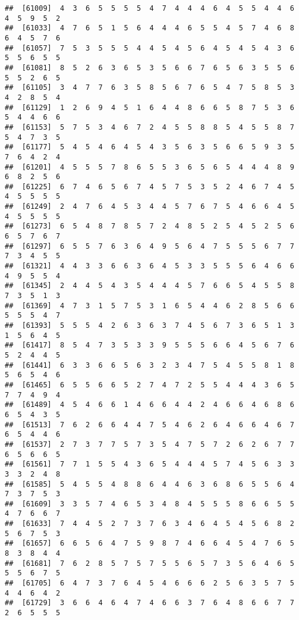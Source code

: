 \documentclass[
]{book}
\begin{document}
\begin{verbatim}
##  [61009]  4  3  6  5  5  5  5  4  7  4  4  4  6  4  5  5  4  4  6  4  5  9  5  2
##  [61033]  4  7  6  5  1  5  6  4  4  4  6  5  5  4  5  7  4  6  8  6  4  5  7  6
##  [61057]  7  5  3  5  5  5  4  4  5  4  5  6  4  5  4  5  4  3  6  5  5  6  5  5
##  [61081]  8  5  2  6  3  6  5  3  5  6  6  7  6  5  6  3  5  5  6  5  5  2  6  5
##  [61105]  3  4  7  7  6  3  5  8  5  6  7  6  5  4  7  5  8  5  3  4  2  8  5  4
##  [61129]  1  2  6  9  4  5  1  6  4  4  8  6  6  5  8  7  5  3  6  5  4  4  6  6
##  [61153]  5  7  5  3  4  6  7  2  4  5  5  8  8  5  4  5  5  8  7  5  4  7  3  5
##  [61177]  5  4  5  4  6  4  5  4  3  5  6  3  5  6  6  5  9  3  5  7  6  4  2  4
##  [61201]  4  5  5  5  7  8  6  5  5  3  6  5  6  5  4  4  4  8  9  6  8  2  5  6
##  [61225]  6  7  4  6  5  6  7  4  5  7  5  3  5  2  4  6  7  4  5  4  5  5  5  5
##  [61249]  2  4  7  6  4  5  3  4  4  5  7  6  7  5  4  6  6  4  5  4  5  5  5  5
##  [61273]  6  5  4  8  7  8  5  7  2  4  8  5  2  5  4  5  2  5  6  6  5  7  6  7
##  [61297]  6  5  5  7  6  3  6  4  9  5  6  4  7  5  5  5  6  7  7  7  3  4  5  5
##  [61321]  4  4  3  3  6  6  3  6  4  5  3  3  5  5  5  6  4  6  6  4  9  5  5  4
##  [61345]  2  4  4  5  4  3  5  4  4  4  5  7  6  6  5  4  5  5  8  7  3  5  1  3
##  [61369]  4  7  3  1  5  7  5  3  1  6  5  4  4  6  2  8  5  6  6  5  5  5  4  7
##  [61393]  5  5  5  4  2  6  3  6  3  7  4  5  6  7  3  6  5  1  3  1  5  6  4  5
##  [61417]  8  5  4  7  3  5  3  3  9  5  5  5  6  6  4  5  6  7  6  5  2  4  4  5
##  [61441]  6  3  3  6  6  5  6  3  2  3  4  7  5  4  5  5  8  1  8  5  6  5  4  6
##  [61465]  6  5  5  6  6  5  2  7  4  7  2  5  5  4  4  4  3  6  5  7  7  4  9  4
##  [61489]  4  5  4  6  6  1  4  6  6  4  4  2  4  6  6  4  6  8  6  6  5  4  3  5
##  [61513]  7  6  2  6  6  4  4  7  5  4  6  2  6  4  6  6  4  6  7  6  5  4  4  6
##  [61537]  2  7  3  7  7  5  7  3  5  4  7  5  7  2  6  2  6  7  7  6  5  6  6  5
##  [61561]  7  7  1  5  5  4  3  6  5  4  4  4  5  7  4  5  6  3  3  3  3  2  4  8
##  [61585]  5  4  5  5  4  8  8  6  4  4  6  3  6  8  6  5  5  6  4  7  3  7  5  3
##  [61609]  3  3  5  7  4  6  5  3  4  8  4  5  5  5  8  6  6  5  5  4  7  6  6  7
##  [61633]  7  4  4  5  2  7  3  7  6  3  4  6  4  5  4  5  6  8  2  5  6  7  5  3
##  [61657]  6  6  5  6  4  7  5  9  8  7  4  6  6  4  5  4  7  6  5  8  3  8  4  4
##  [61681]  7  6  2  8  5  7  5  7  5  5  6  5  7  3  5  6  4  6  5  5  5  6  7  5
##  [61705]  6  4  7  3  7  6  4  5  4  6  6  6  2  5  6  3  5  7  5  4  4  6  4  2
##  [61729]  3  6  6  4  6  4  7  4  6  6  3  7  6  4  8  6  6  7  7  2  6  5  5  5

\end{verbatim}
\end{document}
